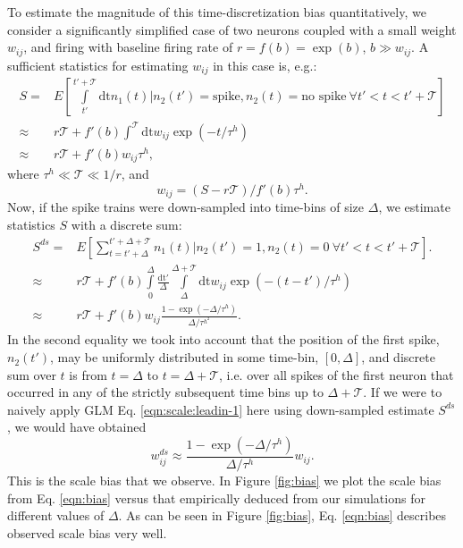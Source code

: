 To estimate the magnitude of this time-discretization bias quantitatively, we consider a significantly simplified case of two neurons coupled with a small weight $w_{ij}$, and firing with baseline firing rate of $r=f(b)=\exp(b)$, $b \gg w_{ij}$.
A sufficient statistics for estimating $w_{ij}$ in this case is, e.g.:
\begin{equation}\label{eqn:scale:leadin-1}
\begin{array}{rl}
S =& E\left[\int\limits_{t'}^{t'+\mathcal{T}} \text{dt} n_1(t) | n_2(t')=\text{spike}, n_2(t)=\text{no spike}\ \forall t'<t<t'+\mathcal{T}\right] \\
\approx & r \mathcal{T} + f'(b) \int^{\mathcal{T}}  \text{dt} w_{ij} \exp(-t/\tau^h) \\
\approx & r \mathcal{T} + f'(b) w_{ij}\tau^h,
\end{array}
\end{equation}
where $\tau^h \ll \mathcal{T} \ll 1/r$, and 
\begin{equation}\label{eqn:scale:leadin-1}
w_{ij}=(S-r\mathcal{T})/f'(b)\tau^h.
\end{equation}
Now, if the spike trains were down-sampled into time-bins of size $\Delta$,
we estimate statistics $S$ with a discrete sum:
\begin{equation}\label{eqn:scale:leadin-2}
\begin{array}{rl}
S^{ds}=&E\left[\sum\limits_{t=t'+\Delta}^{t'+\Delta + \mathcal{T}} n_1(t) | n_2(t')=1, n_2(t)=0\ \forall
t'<t<t'+\mathcal{T}\right]. \\
\approx& r \mathcal{T} + f'(b) \int\limits_0^\Delta \frac{\text{dt}'}{\Delta} \int\limits_{\Delta}^{\Delta + \mathcal{T}} \text{dt} w_{ij}\exp(-(t-t')/\tau^h) \\
\approx & r \mathcal{T} +  f'(b)w_{ij}\frac{1-\exp(-\Delta/\tau^h)}{\Delta/\tau^h^2}.
\end{array}
\end{equation}
In the second equality we took into account that the position of the first spike, $n_2(t')$, may be uniformly distributed in some time-bin, $[0,\Delta]$, and discrete sum over $t$ is from $t=\Delta$ to $t=\Delta+\mathcal{T}$, i.e. over all spikes of the first neuron that occurred in any of the strictly subsequent time bins up to $\Delta + \mathcal{T}$.
If we were to naively apply GLM Eq. \ref{eqn:scale:leadin-1} here using down-sampled estimate $S^{ds}$, we would have obtained
\begin{equation}\label{eqn:bias}
w_{ij}^{ds}\approx \frac{1-\exp(-\Delta/\tau^h)}{\Delta/\tau^h} w_{ij}.
\end{equation}
This is the scale bias that we observe.
In Figure \ref{fig:bias} we plot the scale bias from Eq. \ref{eqn:bias} versus that empirically deduced from our simulations for different values of $\Delta$. As can be seen in Figure \ref{fig:bias}, Eq. \ref{eqn:bias} describes observed scale bias very well.

